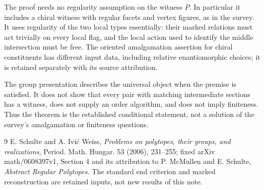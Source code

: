 \documentclass[11pt,a4paper]{article}
\begin{document}
The proof needs no regularity assumption on the witness $P$. In particular
it includes a chiral witness with regular facets and vertex figures, as
in the survey. It uses regularity of the two local types essentially:
their marked relations must act trivially on every local flag, and the
local action used to identify the middle intersection must be free.
The oriented amalgamation assertion for chiral constituents has different
input data, including relative enantiomorphic choices; it is retained
separately with its source attribution.

The group presentation describes the universal object when the premise
is satisfied. It does not show that every pair with matching intermediate
sections has a witness, does not supply an order algorithm, and does not
imply finiteness. Thus the theorem is the established conditional statement,
not a solution of the survey's amalgamation or finiteness questions.

\begin{thebibliography}{9}\small
{} E. Schulte and A. Ivi\'c Weiss,
\emph{Problems on polytopes, their groups, and realizations},
Period. Math. Hungar. 53 (2006), 231--255; fixed arXiv math/0608397v1,
Section 4 and its attribution to P. McMullen and E. Schulte,
\emph{Abstract Regular Polytopes}. The standard end criterion and
marked reconstruction are retained inputs, not new results of this note.
\end{thebibliography}
\end{document}
